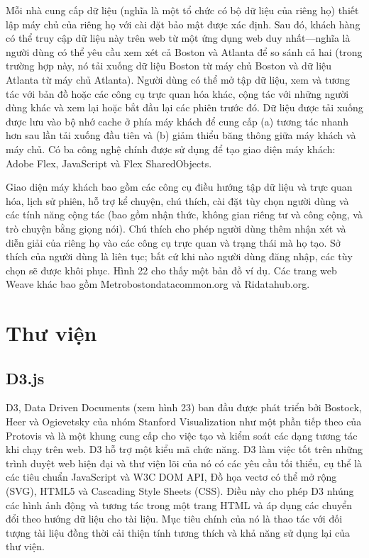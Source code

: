 \documentclass[13pt]{scrartcl} %
\begin{document}
Mỗi nhà cung cấp dữ liệu (nghĩa là một tổ chức có bộ dữ liệu của riêng họ) thiết lập máy chủ của riêng họ với cài đặt bảo mật được xác định. Sau đó, khách hàng có thể truy cập dữ liệu này trên web từ một ứng dụng web duy nhất—nghĩa là người dùng có thể yêu cầu xem xét cả Boston và Atlanta để so sánh cả hai (trong trường hợp này, nó tải xuống dữ liệu Boston từ máy chủ Boston và dữ liệu Atlanta từ máy chủ Atlanta).
Người dùng có thể mở tập dữ liệu, xem và tương tác với bản đồ hoặc các công cụ trực quan hóa khác, cộng tác với những người dùng khác và xem lại hoặc bắt đầu lại các phiên trước đó. Dữ liệu được tải xuống được lưu vào bộ nhớ cache ở phía máy khách để cung cấp (a) tương tác nhanh hơn sau lần tải xuống đầu tiên và (b) giảm thiểu băng thông giữa máy khách và máy chủ. Có ba công nghệ chính được sử dụng để tạo giao diện máy khách: Adobe Flex, JavaScript và Flex SharedObjects.

Giao diện máy khách bao gồm các công cụ điều hướng tập dữ liệu và trực quan hóa, lịch sử phiên, hỗ trợ kể chuyện, chú thích, cài đặt tùy chọn người dùng và các tính năng cộng tác (bao gồm nhận thức, không gian riêng tư và công cộng, và trò chuyện bằng giọng nói). Chú thích cho phép người dùng thêm nhận xét và diễn giải của riêng họ vào các công cụ trực quan và trạng thái mà họ tạo. Sở thích của người dùng là liên tục; bất cứ khi nào người dùng đăng nhập, các tùy chọn sẽ được khôi phục. Hình 22 cho thấy một bản đồ ví dụ. Các trang web Weave khác bao gồm Metrobostondatacommon.org và Ridatahub.org.


\section{Thư viện}
\subsection{D3.js}
D3, Data Driven Documents (xem hình 23) ban đầu được phát triển bởi Bostock, Heer và Ogievetsky của nhóm Stanford Visualization như một phần tiếp theo của Protovis và là một khung cung cấp cho việc tạo và kiểm soát các dạng tương tác khi chạy trên web. D3 hỗ trợ một kiểu mã chức năng. D3 làm việc tốt trên những trình duyệt web hiện đại và thư viện lõi của nó có các yêu cầu tối thiểu, cụ thể là các tiêu chuẩn JavaScript và W3C DOM API, Đồ họa vectơ có thể mở rộng (SVG), HTML5 và Cascading Style Sheets (CSS). Điều này cho phép D3 nhúng các hình ảnh động và tương tác trong một trang HTML và áp dụng các chuyển đổi theo hướng dữ liệu cho tài liệu. Mục tiêu chính của nó là thao tác với đối tượng tài liệu đồng thời cải thiện tính tương thích và khả năng sử dụng lại của thư viện.
\end{document}
